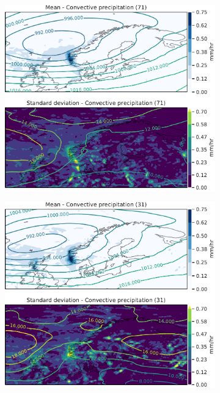 \begin{figure}
     \centering
     \begin{subfigure}[b]{0.49\textwidth}
         \centering
         \includegraphics[width=\textwidth]{Figures/cPENBR.pdf}
         \caption{}
         \label{fig:ENBRcP}
     \end{subfigure}
     \hfill
     \begin{subfigure}[b]{0.49\textwidth}
         \centering
         \includegraphics[width=\textwidth]{Figures/cPENZV.pdf}
         \caption{}
         \label{fig:ENZVcP}
     \end{subfigure}
     

\end{figure}
